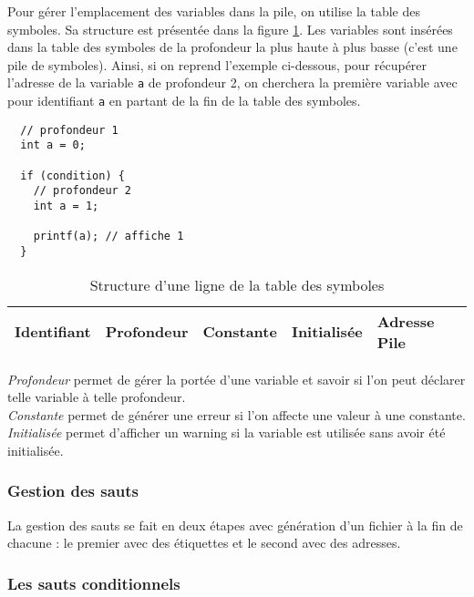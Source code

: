\vspace{10pt}

Pour gérer l’emplacement des variables dans la pile, on utilise la table des symboles. Sa structure est présentée dans la figure \ref{tab:structure-ligne}. Les variables sont insérées dans la table des symboles de la profondeur la plus haute à plus basse (c'est une pile de symboles). Ainsi, si on reprend l’exemple ci-dessous, pour récupérer l’adresse de la variable \texttt{a} de profondeur 2, on cherchera la première variable avec pour identifiant \texttt{a} en partant de la fin de la table des symboles.

\begin{verbatim}
  // profondeur 1
  int a = 0;
  
  if (condition) {
    // profondeur 2
    int a = 1;
    
    printf(a); // affiche 1
  }
\end{verbatim}

\begin{table}[h!]
  \begin{center}
  \begin{tabular}{| l | l | l | l | l |}
    \hline
    Identifiant & Profondeur & Constante & Initialisée & Adresse Pile\\
    \hline
  \end{tabular}
  \end{center}
  {\small
    \textit{Profondeur} permet de gérer la portée d’une variable et savoir si l’on peut déclarer telle variable à telle profondeur.\\
    \textit{Constante} permet de générer une erreur si l’on affecte une valeur à une constante.\\
    \textit{Initialisée} permet d’afficher un warning si la variable est utilisée sans avoir été initialisée.\\
  }
  \caption{Structure d'une ligne de la table des symboles}
  \label{tab:structure-ligne}
\end{table}

\subsubsection{Gestion des sauts}

La gestion des sauts se fait en deux étapes avec génération d'un fichier à la fin de chacune : le premier avec des étiquettes et le second avec des adresses.

\subsubsection*{Les sauts conditionnels}


